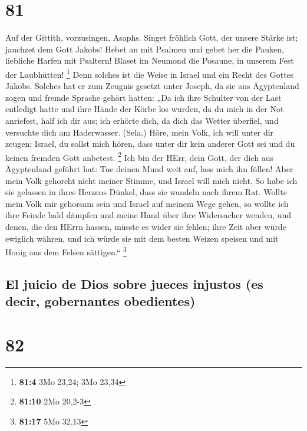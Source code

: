 \hypertarget{section-80}{%
\section{81}\label{section-80}}

 Auf der Gittith, vorzusingen, Asaphs. 
Singet fröhlich Gott, der unsere Stärke ist; jauchzet dem Gott Jakobs!
 Hebet an mit Psalmen und gebet her die Pauken, liebliche
Harfen mit Psaltern!  Blaset im Neumond die Posaune, in
unserem Fest der Laubhütten! \footnote{\textbf{81:4} 3Mo 23,24; 3Mo
  23,34}  Denn solches ist die Weise in Israel und ein
Recht des Gottes Jakobs.  Solches hat er zum Zeugnis
gesetzt unter Joseph, da sie aus Ägyptenland zogen und fremde Sprache
gehört hatten:  „Da ich ihre Schulter von der Last
entledigt hatte und ihre Hände der Körbe los wurden,  da
du mich in der Not anriefest, half ich dir aus; ich erhörte dich, da
dich das Wetter überfiel, und versuchte dich am Haderwasser. (Sela.)
 Höre, mein Volk, ich will unter dir zeugen; Israel, du
sollst mich hören,  dass unter dir kein anderer Gott sei
und du keinen fremden Gott anbetest. \footnote{\textbf{81:10} 2Mo 20,2-3}
 Ich bin der HErr, dein Gott, der dich aus Ägyptenland
geführt hat: Tue deinen Mund weit auf, lass mich ihn füllen!
 Aber mein Volk gehorcht nicht meiner Stimme, und Israel
will mich nicht.  So habe ich sie gelassen in ihres
Herzens Dünkel, dass sie wandeln nach ihrem Rat.  Wollte
mein Volk mir gehorsam sein und Israel auf meinem Wege gehen,
 so wollte ich ihre Feinde bald dämpfen und meine Hand
über ihre Widersacher wenden,  und denen, die den HErrn
hassen, müsste es wider sie fehlen; ihre Zeit aber würde ewiglich
währen,  und ich würde sie mit dem besten Weizen speisen
und mit Honig aus dem Felsen sättigen.`` \footnote{\textbf{81:17} 5Mo
  32,13}

\hypertarget{el-juicio-de-dios-sobre-jueces-injustos-es-decir-gobernantes-obedientes}{%
\subsection{El juicio de Dios sobre jueces injustos (es decir,
gobernantes
obedientes)}\label{el-juicio-de-dios-sobre-jueces-injustos-es-decir-gobernantes-obedientes}}

\hypertarget{section-81}{%
\section{82}\label{section-81}}

